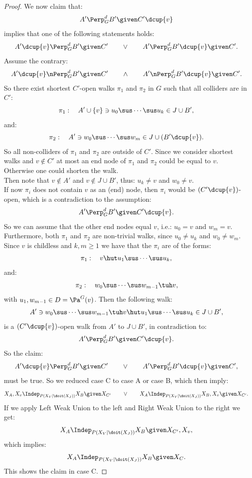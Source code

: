 \begin{Thm}
\begin{proof}
We now claim that:
\[A' \Perp^d_G  B' \given C'\dcup\{v\}\]
implies that one of the following statements holds:
\[  A' \dcup \{v\} \Perp^d_G  B' \given C' \qquad \lor \qquad A' \Perp^d_G B' \dcup \{v\} \given C'. \]
Assume the contrary:
\[  A' \dcup \{v\} \nPerp^d_G  B' \given C' \qquad \land \qquad A' \nPerp^d_G B' \dcup \{v\} \given C'. \]
So there exist shortest $C'$-open walks $\pi_1$ and $\pi_2$ in $G$ such that all colliders are in $C'$:
\[ \pi_1:\quad  A' \cup \{v\}\ni u_0 \sus \cdots \sus u_k \in J \cup B',  \]
and:
\[ \pi_2:\quad  A' \ni w_0 \sus \cdots \sus w_m \in J \cup (B' \dcup \{v\}).  \]
So all non-colliders of $\pi_1$ and $\pi_2$ are outside of $C'$.
Since we consider shortest walks and $v \notin C'$ at most an end node of $\pi_1$ and $\pi_2$ could be equal to $v$.
Otherwise one could shorten the walk.\\
Then note that $v \notin A'$ and $v \notin J \cup B'$, thus: $u_k \neq v$ and $w_0 \neq v$.\\
If now $\pi_i$ does not contain $v$ as an (end) node, then $\pi_i$ would be $(C'\dcup \{v\})$-open,
which is a contradiction to the assumption:
\[A' \Perp^d_G  B' \given C'\dcup\{v\}.\]
So we can assume that the other end nodes equal $v$, i.e.: $u_0=v$ and $w_m =v$.\\
Furthermore, both $\pi_1$ and $\pi_2$ are non-trivial walks, since $u_0 \neq u_k$ and $w_0 \neq w_m$.
Since $v$ is childless and $k,m \ge 1$ we have that the $\pi_i$ are of the forms:
\[ \pi_1:\quad   v \hut u_1 \sus \cdots \sus u_k,  \]
and:
\[ \pi_2:\quad  w_0 \sus \cdots \sus w_{m-1} \tuh v,  \]
with $u_1, w_{m-1} \in D=\Pa^G(v)$. Then the following walk:
\[ A' \ni  w_0 \sus \cdots \sus w_{m-1} \tuh v \hut u_1 \sus \cdots \sus u_k \in J \cup B',  \]
is a $(C' \dcup \{v\})$-open walk from $A'$ to $J \cup B'$, in contradiction to:
\[A' \Perp^d_G B' \given C'\dcup\{v\}.\]
So the claim:
\[  A' \dcup \{v\} \Perp^d_G  B' \given C' \qquad \lor \qquad A' \Perp^d_G B' \dcup \{v\} \given C', \]
must be true. 
So we reduced case C to case A or case B, which then imply:
\[ X_A,X_v \Indep_{P(X_V|\doit(X_J))}  X_B \given X_{C'} \qquad \lor \qquad X_A \Indep_{P(X_V|\doit(X_J))}  X_B,X_v \given X_{C'}.\]
If we apply Left Weak Union to the left and Right Weak Union to the right we get:
\[ X_A \Indep_{P(X_V|\doit(X_J))}  X_B \given X_{C'},X_v,\]
which implies:
\[ X_A \Indep_{P(X_V|\doit(X_J))}  X_B \given X_C.\]
This shows the claim in case C.
\end{proof}

\end{Thm}

